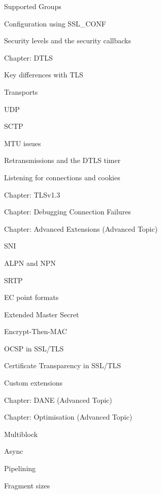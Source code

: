 \documentclass[oneside]{book}
\begin{document}
\begin{outline}
\begin{outline}
\begin{outline}
      \item{Supported Groups}
      \item{Configuration using SSL\_CONF}
      \item{Security levels and the security callbacks}
    \end{outline}
    \item{Chapter: DTLS}
    \begin{outline}
      \item{Key differences with TLS}
      \item{Transports}
      \begin{outline}
        \item{UDP}
        \item{SCTP}
        \item{MTU issues}
      \end{outline}
      \item{Retransmissions and the DTLS timer}
      \item{Listening for connections and cookies}
    \end{outline}
    \item{Chapter: TLSv1.3}
    \item{Chapter: Debugging Connection Failures}
    \item{Chapter: Advanced Extensions (Advanced Topic)}
    \begin{outline}
      \item{SNI}
      \item{ALPN and NPN}
      \item{SRTP}
      \item{EC point formats}
      \item{Extended Master Secret}
      \item{Encrypt-Then-MAC}
      \item{OCSP in SSL/TLS}
      \item{Certificate Transparency in SSL/TLS}
      \item{Custom extensions}
    \end{outline}
    \item{Chapter: DANE (Advanced Topic)}
    \item{Chapter: Optimisation (Advanced Topic)}
    \begin{outline}
      \item{Multiblock}
      \item{Async}
      \item{Pipelining}
      \item{Fragment sizes}

\end{outline}
\end{outline}
\end{outline}
\end{document}
